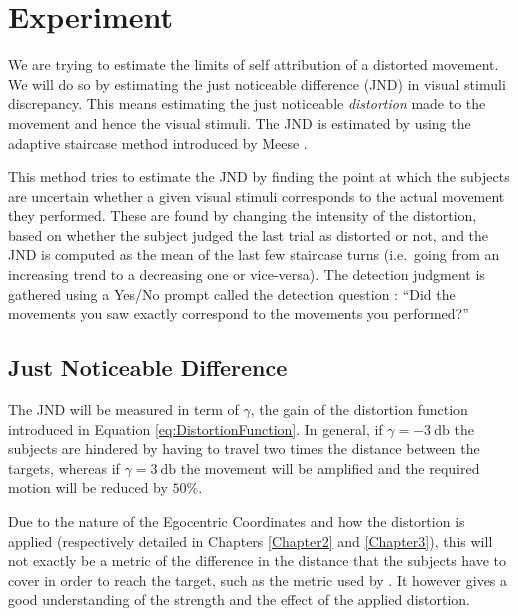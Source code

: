 
\chapter{Experiment} %

\label{Chapter4} %

We are trying to estimate the limits of self attribution of a distorted movement. We will do so by estimating the just noticeable difference (JND) in visual stimuli discrepancy. This means estimating the just noticeable \textit{distortion} made to the movement and hence the visual stimuli. The JND is estimated by using the adaptive staircase method introduced by Meese \cite{meese1995using}.

This method tries to estimate the JND by finding the point at which the subjects are uncertain whether a given visual stimuli corresponds to the actual movement they performed. These are found by changing the intensity of the distortion, based on whether the subject judged the last trial as distorted or not, and the JND is computed as the mean of the last few staircase turns (i.e.\ going from an increasing trend to a decreasing one or vice-versa). The detection judgment is gathered using a Yes/No prompt called the detection question : ``Did the movements you saw exactly correspond to the movements you performed?''

\section{Just Noticeable Difference}

The JND will be measured in term of $\gamma$, the gain of the distortion function introduced in Equation \ref{eq:DistortionFunction}. In general, if $\gamma = \SI{-3}{\decibel}$ the subjects are hindered by having to travel two times the distance between the targets, whereas if $\gamma = \SI{3}{\decibel}$ the movement will be amplified and the required motion will be reduced by $50\%$.

Due to the nature of the Egocentric Coordinates and how the distortion is applied (respectively detailed in Chapters \ref{Chapter2} and \ref{Chapter3}), this will not exactly be a metric of the difference in the distance that the subjects have to cover in order to reach the target, such as the metric used by \cite{debarba2017embodiment}. It however gives a good understanding of the strength and the effect of the applied distortion.

